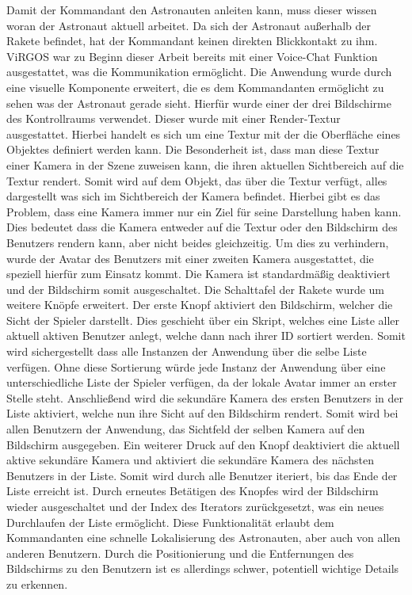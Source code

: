 Damit der Kommandant den Astronauten anleiten kann, muss dieser wissen woran der Astronaut aktuell arbeitet. Da sich der Astronaut außerhalb der Rakete befindet, hat der Kommandant keinen direkten Blickkontakt zu ihm. ViRGOS war zu Beginn dieser Arbeit bereits mit einer Voice-Chat Funktion ausgestattet, was die Kommunikation ermöglicht. Die Anwendung wurde durch eine visuelle Komponente erweitert, die es dem Kommandanten ermöglicht zu sehen was der Astronaut gerade sieht. Hierfür wurde einer der drei Bildschirme des Kontrollraums verwendet. Dieser wurde mit einer Render-Textur ausgestattet. Hierbei handelt es sich um eine Textur mit der die Oberfläche eines Objektes definiert werden kann. Die Besonderheit ist, dass man diese Textur einer Kamera in der Szene zuweisen kann, die ihren aktuellen Sichtbereich auf die Textur rendert. Somit wird auf dem Objekt, das über die Textur verfügt, alles dargestellt was sich im Sichtbereich der Kamera befindet. Hierbei gibt es das Problem, dass eine Kamera immer nur ein Ziel für seine Darstellung haben kann. Dies bedeutet dass die Kamera entweder auf die Textur oder den Bildschirm des Benutzers rendern kann, aber nicht beides gleichzeitig. Um dies zu verhindern, wurde der Avatar des Benutzers mit einer zweiten Kamera ausgestattet, die speziell hierfür zum Einsatz kommt. Die Kamera ist standardmäßig deaktiviert und der Bildschirm somit ausgeschaltet. Die Schalttafel der Rakete wurde um weitere Knöpfe erweitert. Der erste Knopf aktiviert den Bildschirm, welcher die Sicht der Spieler darstellt. Dies geschieht über ein Skript, welches eine Liste aller aktuell aktiven Benutzer anlegt, welche dann nach ihrer ID sortiert werden. Somit wird sichergestellt dass alle Instanzen der Anwendung über die selbe Liste verfügen. Ohne diese Sortierung würde jede Instanz der Anwendung über eine unterschiedliche Liste der Spieler verfügen, da der lokale Avatar immer an erster Stelle steht. Anschließend wird die sekundäre Kamera des ersten Benutzers in der Liste aktiviert, welche nun ihre Sicht auf den Bildschirm rendert. Somit wird bei allen Benutzern der Anwendung, das Sichtfeld der selben Kamera auf den Bildschirm ausgegeben. Ein weiterer Druck auf den Knopf deaktiviert die aktuell aktive sekundäre Kamera und aktiviert die sekundäre Kamera des nächsten Benutzers in der Liste. Somit wird durch alle Benutzer iteriert, bis das Ende der Liste erreicht ist. Durch erneutes Betätigen des Knopfes wird der Bildschirm wieder ausgeschaltet und der Index des Iterators zurückgesetzt, was ein neues Durchlaufen der Liste ermöglicht. Diese Funktionalität erlaubt dem Kommandanten eine schnelle Lokalisierung des Astronauten, aber auch von allen anderen Benutzern. Durch die Positionierung und die Entfernungen des Bildschirms zu den Benutzern ist es allerdings schwer, potentiell wichtige Details zu erkennen.\newline

